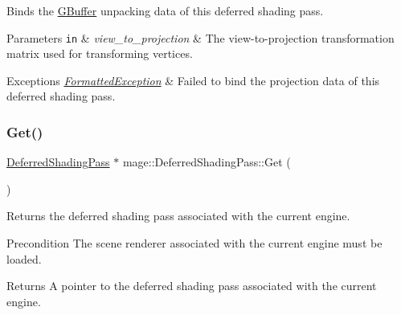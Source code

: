 Binds the \hyperlink{structmage_1_1_g_buffer}{G\+Buffer} unpacking data of this deferred shading pass.


\begin{DoxyParams}[1]{Parameters}
\mbox{\tt in}  & {\em view\+\_\+to\+\_\+projection} & The view-\/to-\/projection transformation matrix used for transforming vertices. \\
\hline
\end{DoxyParams}

\begin{DoxyExceptions}{Exceptions}
{\em \hyperlink{structmage_1_1_formatted_exception}{Formatted\+Exception}} & Failed to bind the projection data of this deferred shading pass. \\
\hline
\end{DoxyExceptions}
\hypertarget{classmage_1_1_deferred_shading_pass_a430dec186afda1f40c695b95fe3f7338}{}\label{classmage_1_1_deferred_shading_pass_a430dec186afda1f40c695b95fe3f7338} 
\subsubsection{\texorpdfstring{Get()}{Get()}}
{\footnotesize\ttfamily \hyperlink{classmage_1_1_deferred_shading_pass}{Deferred\+Shading\+Pass} $\ast$ mage\+::\+Deferred\+Shading\+Pass\+::\+Get (\begin{DoxyParamCaption}{ }\end{DoxyParamCaption})\hspace{0.3cm}{\ttfamily [static]}}

Returns the deferred shading pass associated with the current engine.

\begin{DoxyPrecond}{Precondition}
The scene renderer associated with the current engine must be loaded. 
\end{DoxyPrecond}
\begin{DoxyReturn}{Returns}
A pointer to the deferred shading pass associated with the current engine. 
\end{DoxyReturn}
\hypertarget{classmage_1_1_deferred_shading_pass_afcb5b0299030a2a60dcb3685ca875e3e}{}\label{classmage_1_1_deferred_shading_pass_afcb5b0299030a2a60dcb3685ca875e3e} 
